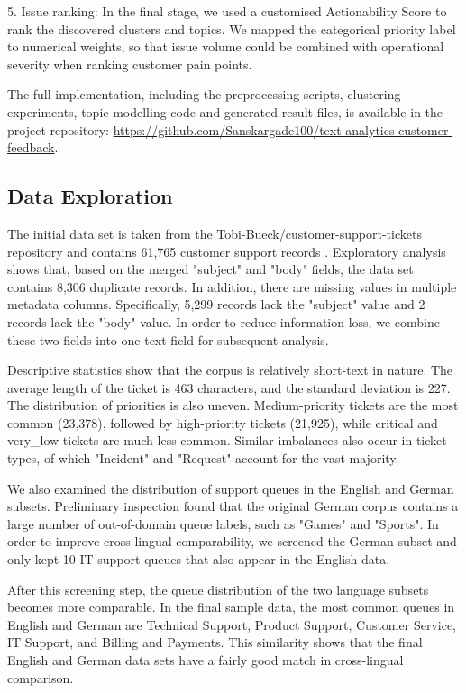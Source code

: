 \documentclass[11pt]{article}
\begin{document}
5. Issue ranking: In the final stage, we used a customised Actionability Score to rank the discovered clusters and topics. We mapped the categorical priority label to numerical weights, so that issue volume could be combined with operational severity when ranking customer pain points.

The full implementation, including the preprocessing scripts, clustering experiments, topic-modelling code and generated result files, is available in the project repository: \url{https://github.com/Sanskargade100/text-analytics-customer-feedback}.

\subsection{Data Exploration}

The initial data set is taken from the Tobi-Bueck/customer-support-tickets repository and contains 61,765 customer support records \citep{bueck2025customersupporttickets}. Exploratory analysis shows that, based on the merged "subject" and "body" fields, the data set contains 8,306 duplicate records. In addition, there are missing values in multiple metadata columns. Specifically, 5,299 records lack the "subject" value and 2 records lack the "body" value. In order to reduce information loss, we combine these two fields into one text field for subsequent analysis.

Descriptive statistics show that the corpus is relatively short-text in nature. The average length of the ticket is 463 characters, and the standard deviation is 227. The distribution of priorities is also uneven. Medium-priority tickets are the most common (23,378), followed by high-priority tickets (21,925), while critical and very\_low tickets are much less common. Similar imbalances also occur in ticket types, of which "Incident" and "Request" account for the vast majority.

We also examined the distribution of support queues in the English and German subsets. Preliminary inspection found that the original German corpus contains a large number of out-of-domain queue labels, such as "Games" and "Sports". In order to improve cross-lingual comparability, we screened the German subset and only kept 10 IT support queues that also appear in the English data.

After this screening step, the queue distribution of the two language subsets becomes more comparable. In the final sample data, the most common queues in English and German are Technical Support, Product Support, Customer Service, IT Support, and Billing and Payments. This similarity shows that the final English and German data sets have a fairly good match in cross-lingual comparison.
\end{document}
